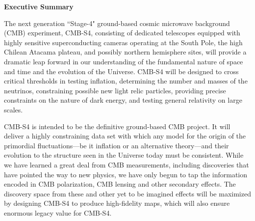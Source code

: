 \begin{center}
  {\Large \bf Executive Summary}
\end{center}

The next generation ``Stage-4" ground-based cosmic microwave background (CMB) experiment, CMB-S4, consisting of dedicated telescopes equipped with highly sensitive superconducting cameras operating at the South Pole, the high Chilean Atacama plateau, and possibly northern hemisphere sites, will provide a dramatic leap forward in our understanding of the fundamental nature of space and time and the evolution of the Universe. CMB-S4 will be designed to cross critical thresholds in testing inflation, determining the number and masses of the neutrinos, constraining possible new light relic particles, providing precise constraints on the nature of dark energy, and testing general relativity on large scales. 

CMB-S4 is intended to be the definitive ground-based CMB project. It will deliver a highly constraining data set with which any model for the origin of the primordial fluctuations---be it inflation or an alternative theory---and their evolution to the structure seen in the Universe today must be consistent. %
While we have learned a great deal from CMB measurements, including discoveries that have pointed the way to new physics, we have only begun to tap the information encoded in CMB polarization, CMB lensing and other secondary effects.  The discovery space from these and other yet to be imagined effects will be  maximized by designing CMB-S4 to produce high-fidelity maps, which will also ensure enormous legacy value for CMB-S4.


